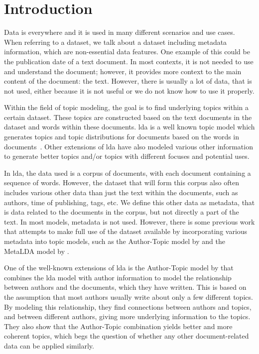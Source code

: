 \section{Introduction}\label{sec:introduction}
Data is everywhere and it is used in many different scenarios and use cases. 
When referring to a dataset, we talk about a dataset including metadata information, which are non-essential data features.
One example of this could be the publication date of a text document. 
In most contexts, it is not needed to use and understand the document; however, it provides more context to the main content of the document: the text.
However, there is usually a lot of data, that is not used, either because it is not useful or we do not know how to use it properly.

Within the field of topic modeling, the goal is to find underlying topics within a certain dataset.
These topics are constructed based on the text documents in the dataset and words within these documents. 
\Gls{lda} is a well known topic model which generates topics and topic distributions for documents based on the words in documents~\cite{blei2003latent}.
Other extensions of \gls{lda} have also modeled various other information to generate better topics and/or topics with different focuses and potential uses.

In \gls{lda}, the data used is a corpus of documents, with each document containing a sequence of words.
However, the dataset that will form this corpus also often includes various other data than just the text within the documents, such as authors, time of publishing, tags, etc.
We define this other data as metadata, that is data related to the documents in the corpus, but not directly a part of the text.
In most models, metadata is not used.
However, there is some previous work that attempts to make full use of the dataset available by incorporating various metadata into topic models, such as the Author-Topic model by \citet{author_topic_2012} and the MetaLDA model by \citet{MetaLDA2017}.

One of the well-known extensions of \gls{lda} is the Author-Topic model by \citet{author_topic_2012} that combines the \gls{lda} model with author information to model the relationship between authors and the documents, which they have written.
This is based on the assumption that most authors usually write about only a few different topics.
By modeling this relationship, they find connections between authors and topics, and between different authors, giving more underlying information to the topics.
They also show that the Author-Topic combination yields better and more coherent topics, which begs the question of whether any other document-related data can be applied similarly.

